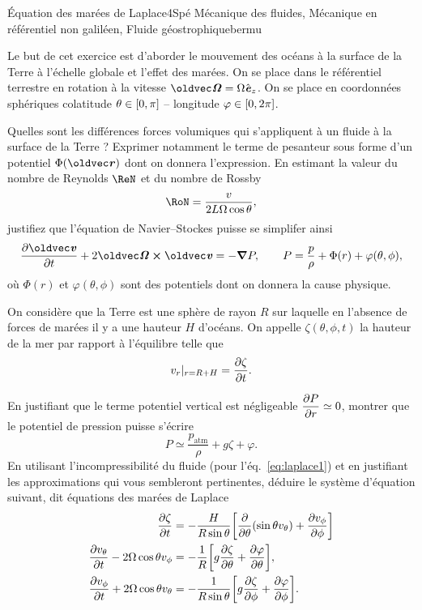 
\begin{exercise}{\'Equation des marées de Laplace}{4}{Spé}
{Mécanique des fluides, Mécanique en référentiel non galiléen, Fluide géostrophique}{bermu}

Le but de cet exercice est d'aborder le mouvement des océans à la surface de la Terre à l'échelle globale et l'effet des marées. On se place dans le référentiel terrestre en rotation à la vitesse $\vOm = \Omega\ve_z$. On se place en coordonnées sphériques colatitude $\theta\in\qty[0,\pi]$ -- longitude $\varphi\in\qty[0,2\pi]$.


\begin{questions}
    \questioncours Quelles sont les différences forces volumiques qui s'appliquent à un fluide à la surface de la Terre ? Exprimer notamment le terme de pesanteur sous forme d'un potentiel $\Phi(\vr)$ dont on donnera l'expression.
    \question En estimant la valeur du nombre de Reynolds $\ReN$ et du nombre de Rossby
    $$\RoN = \dfrac{v}{2L\Omega\cos\theta},$$
    justifiez que l'équation de Navier--Stockes puisse se simplifer ainsi
    $$\pdv{\vv}{t} + 2\vOm\cross\vv = -\grad P, \qquad P = \dfrac{p}{\rho} + \Phi(r) + \varphi(\theta,\phi),$$
    où $\Phi(r)$ et $\varphi(\theta,\phi)$ sont des potentiels dont on donnera la cause physique.
\begin{EnvUplevel}
On considère que la Terre est une sphère de rayon $R$ sur laquelle en l'absence de forces de marées il y a une hauteur $H$ d'océans. On appelle $\zeta(\theta,\phi,t)$ la hauteur de la mer par rapport à l'équilibre telle que
$$v_r|_{r = R + H} = \pdv{\zeta}{t}.$$ 
\end{EnvUplevel}
    \question En justifiant que le terme potentiel vertical est négligeable
    $\displaystyle\pdv{P}{r} \simeq 0$, montrer que le potentiel de pression puisse s'écrire
    $$P \simeq \dfrac{p_\text{atm}}{\rho} + g\zeta + \varphi.$$
    \question En utilisant l'incompressibilité du fluide (pour l'éq.~\ref{eq:laplace1}) et en justifiant les approximations qui vous sembleront pertinentes, déduire le système d'équation suivant, dit équations des marées de Laplace
    \begin{align}
    \pdv{\zeta}{t} &= -\dfrac{H}{R\sin\theta}\qty[\pdv{}{\theta}\qty(\sin\theta v_\theta) + \pdv{v_\phi}{\phi}] \label{eq:laplace1} \\
    \pdv{v_\theta}{t} - 2\Omega\cos\theta v_\phi &= -\dfrac{1}{R}\qty[g\pdv{\zeta}{\theta} +\pdv{\varphi}{\theta}], \\
    \pdv{v_\phi}{t} + 2\Omega\cos\theta v_\theta &= -\dfrac{1}{R\sin\theta}\qty[g\pdv{\zeta}{\phi}+\pdv{\varphi}{\phi}].
\end{align}
\end{questions}


\end{exercise}
